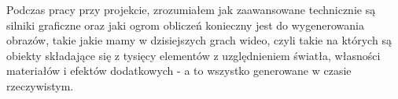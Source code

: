 \documentclass[12pt]{article}
\begin{document}
Podczas pracy przy projekcie, zrozumiałem jak zaawansowane technicznie są silniki graficzne oraz jaki ogrom obliczeń konieczny jest do wygenerowania obrazów, takie jakie mamy w dzisiejszych grach wideo, czyli takie na których są obiekty składające się z tysięcy elementów z uzględnieniem światła, własności materiałów i efektów dodatkowych - a to wszystko generowane w czasie rzeczywistym.
\end{document}

